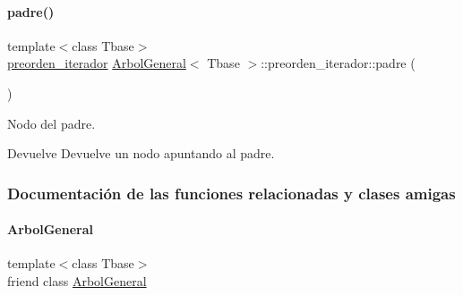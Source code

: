 \paragraph{\texorpdfstring{padre()}{padre()}}
{\footnotesize\ttfamily template$<$class Tbase$>$ \\
\hyperlink{classArbolGeneral_1_1preorden__iterador}{preorden\+\_\+iterador} \hyperlink{classArbolGeneral}{Arbol\+General}$<$ Tbase $>$\+::preorden\+\_\+iterador\+::padre (\begin{DoxyParamCaption}{ }\end{DoxyParamCaption})\hspace{0.3cm}{\ttfamily [inline]}}



Nodo del padre. 

\begin{DoxyReturn}{Devuelve}
Devuelve un nodo apuntando al padre. 
\end{DoxyReturn}


\subsubsection{Documentación de las funciones relacionadas y clases amigas}
\hypertarget{classArbolGeneral_1_1preorden__iterador_a9c06e31b7c3e0d4ee5b03003d32935a5}{}\label{classArbolGeneral_1_1preorden__iterador_a9c06e31b7c3e0d4ee5b03003d32935a5} 
\paragraph{\texorpdfstring{Arbol\+General}{ArbolGeneral}}
{\footnotesize\ttfamily template$<$class Tbase$>$ \\
friend class \hyperlink{classArbolGeneral}{Arbol\+General}\hspace{0.3cm}{\ttfamily [friend]}}

\hypertarget{classArbolGeneral_1_1preorden__iterador_ad7df6535fb84021c7c3804850af9fdcd}{}\label{classArbolGeneral_1_1preorden__iterador_ad7df6535fb84021c7c3804850af9fdcd} 
